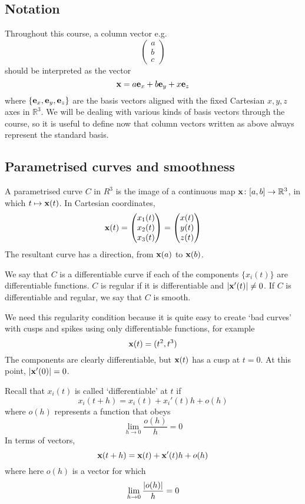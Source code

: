 \subsection{Notation}
Throughout this course, a column vector e.g.
\[
	\begin{pmatrix}
		a \\ b \\ c
	\end{pmatrix}
\]
should be interpreted as the vector
\[
	\vb x = a \vb e_x + b \vb e_y + x \vb e_z
\]
where \(\{ \vb e_x, \vb e_y, \vb e_z \}\) are the basis vectors aligned with the fixed Cartesian \(x, y, z\) axes in \(\mathbb R^3\).
We will be dealing with various kinds of basis vectors through the course, so it is useful to define now that column vectors written as above always represent the standard basis.

\subsection{Parametrised curves and smoothness}
A parametrised curve \(C\) in \(R^3\) is the image of a continuous map \(\vb x \colon [a, b] \to \mathbb R^3\), in which \(t \mapsto \vb x(t)\).
In Cartesian coordinates,
\[
	\vb x(t) = \begin{pmatrix}
		x_1(t) \\ x_2(t) \\ x_3(t)
	\end{pmatrix} = \begin{pmatrix}
		x(t) \\ y(t) \\ z(t)
	\end{pmatrix}
\]
The resultant curve has a direction, from \(\vb x(a)\) to \(\vb x(b)\).
\begin{definition}
	We say that \(C\) is a differentiable curve if each of the components \(\{x_i(t)\}\) are differentiable functions.
	\(C\) is regular if it is differentiable and \(\abs{\vb x'(t)} \neq 0\).
	If \(C\) is differentiable and regular, we say that \(C\) is smooth.
\end{definition}
\begin{note}
	We need this regularity condition because it is quite easy to create `bad curves' with cusps and spikes using only differentiable functions, for example
	\[
		\vb x(t) = (t^2, t^3)
	\]
	The components are clearly differentiable, but \(\vb x(t)\) has a cusp at \(t = 0\).
	At this point, \(\abs{\vb x'(0)} = 0\).
\end{note}
\begin{definition}
	Recall that \(x_i(t)\) is called `differentiable' at \(t\) if
	\[
		x_i(t+h) = x_i(t) + x_i'(t)h + o(h)
	\]
	where \(o(h)\) represents a function that obeys
	\[
		\lim_{h \to 0} \frac{o(h)}{h} = 0
	\]
	In terms of vectors,
	\[
		\vb x(t+h) = \vb x(t) + \vb x'(t)h + o(h)
	\]
	where here \(o(h)\) is a vector for which
	\[
		\lim_{h \to 0} \frac{\abs{o(h)}}{h} = 0
	\]
\end{definition}

